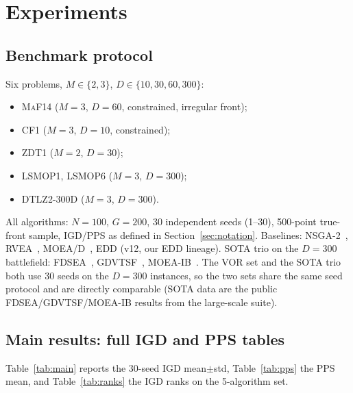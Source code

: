 \documentclass[preprint,12pt]{elsarticle}
\begin{document}
\section{Experiments}
\label{sec:exp}

\subsection{Benchmark protocol}
Six problems, $M\in\{2,3\}$, $D\in\{10,30,60,300\}$:
\begin{itemize}
\item \textsc{MaF14} ($M=3$, $D=60$, constrained, irregular front);
\item \textsc{CF1} ($M=3$, $D=10$, constrained);
\item \textsc{ZDT1} ($M=2$, $D=30$);
\item \textsc{LSMOP1}, \textsc{LSMOP6} ($M=3$, $D=300$);
\item \textsc{DTLZ2}-300D ($M=3$, $D=300$).
\end{itemize}
All algorithms: $N=100$, $G=200$, 30 independent seeds (1--30),
500-point true-front sample, IGD/PPS as defined in
Section~\ref{sec:notation}.
Baselines: \textsc{NSGA-2}~\cite{deb2002nsga},
\textsc{RVEA}~\cite{cheng2016a}, \textsc{MOEA/D}~\cite{qingfuzhang2007moead},
\textsc{EDD} (v12, our EDD lineage). SOTA trio on the $D=300$ battlefield:
\textsc{FDSEA}~\cite{fdsea2024}, \textsc{GDVTSF}~\cite{gdvtsf2025},
\textsc{MOEA-IB}~\cite{moeaib2025}. The \textsc{VOR} set and the SOTA trio
both use 30 seeds on the $D=300$ instances, so the two sets share the
same seed protocol and are directly comparable (SOTA data are the public
\textsc{FDSEA}/\textsc{GDVTSF}/\textsc{MOEA-IB} results from the
large-scale suite).

\subsection{Main results: full IGD and PPS tables}
\label{sec:results}
Table~\ref{tab:main} reports the 30-seed IGD mean$\pm$std,
Table~\ref{tab:pps} the PPS mean, and
Table~\ref{tab:ranks} the IGD ranks on the 5-algorithm set.
\end{document}
